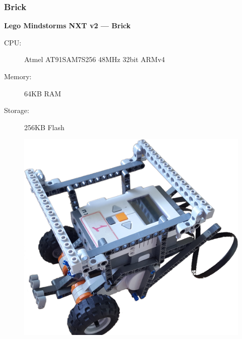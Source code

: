 \documentclass{beamer}
\begin{document}
\begin{frame}
  \frametitle{Brick}

  \textbf{Lego Mindstorms NXT v2 --- Brick}
  \begin{description}
    \item[CPU:] Atmel AT91SAM7S256 48MHz 32bit ARMv4
    \item[Memory:] 64KB RAM
    \item[Storage:] 256KB Flash
  \end{description}

  \begin{figure}
    \centering\includegraphics[height=0.4\textheight]{imgs/brick.png}
  \end{figure}
\end{frame}
\end{document}
